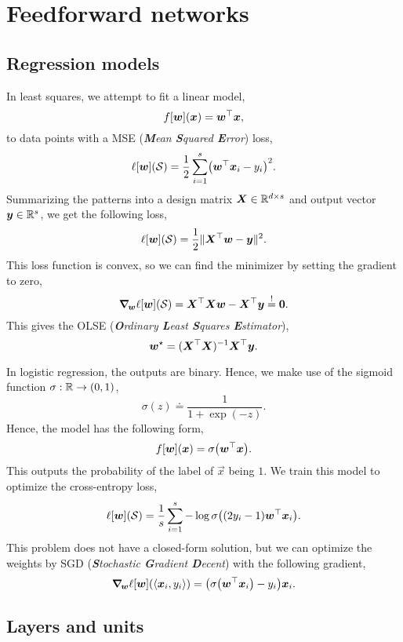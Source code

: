 \section{Feedforward networks}

\subsection{Regression models}

In least squares, we attempt to fit a linear model, \[
    f[\vec{w}](\vec{x}) = \transpose{\vec{w}}\vec{x},
\]
to data points with a MSE (\textit{\textbf{M}ean \textbf{S}quared \textbf{E}rror}) loss, \[
    \ell[\vec{w}](\mathcal{S}) = \frac{1}{2} \sum_{i=1}^{s} \lft( \transpose{\vec{w}} \vec{x}_i - y_i \rgt)^2.
\]
Summarizing the patterns into a design matrix $\mat{X} \in \R^{d \times s}$ and output vector
$\vec{y} \in \R^s$, we get the following loss, \[
    \ell[\vec{w}](\mathcal{S}) = \frac{1}{2} \| \transpose{\mat{X}} \vec{w} - \vec{y} \|^2.
\]
This loss function is convex, so we can find the minimizer by setting the gradient to zero, \[
    \grad{\ell[\vec{w}](\mathcal{S})}{\vec{w}} = \transpose{\mat{X}} \mat{X} \vec{w} - \transpose{\mat{X}} \vec{y} \condeq \vec{0}.
\]
This gives the OLSE (\textit{\textbf{O}rdinary \textbf{L}east \textbf{S}quares
    \textbf{E}stimator}), \[
    \vec{w}^\star = \inv{(\transpose{\mat{X}} \mat{X})} \transpose{\mat{X}} \vec{y}.
\]

In logistic regression, the outputs are binary. Hence, we make use of the sigmoid function $\sigma:
    \R \to (0,1)$, \[
    \sigma(z) \doteq \frac{1}{1 + \exp(-z)}.
\]
Hence, the model has the following form, \[
    f[\vec{w}](\vec{x}) = \sigma \lft( \transpose{\vec{w}}\vec{x} \rgt).
\]
This outputs the probability of the label of $\vec{x}$ being $1$. We train this model to optimize
the cross-entropy loss, \[
    \ell[\vec{w}](\mathcal{S}) = \frac{1}{s} \sum_{i=1}^{s} -\log \sigma \lft( (2y_i - 1) \transpose{\vec{w}} \vec{x}_i \rgt).
\]
This problem does not have a closed-form solution, but we can optimize the weights by SGD
(\textit{\textbf{S}tochastic \textbf{G}radient \textbf{D}ecent}) with the following gradient, \[
    \grad{\ell[\vec{w}](\langle \vec{x}_i, y_i \rangle)}{\vec{w}} = \lft( \sigma \lft( \transpose{\vec{w}} \vec{x}_i \rgt) - y_i \rgt) \vec{x}_i.
\]

\subsection{Layers and units}

